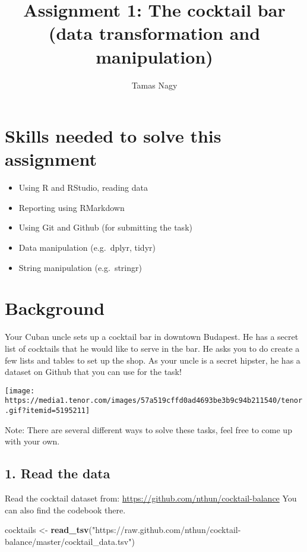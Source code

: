 \documentclass[
]{article}
\title{Assignment 1: The cocktail bar (data transformation and manipulation)}
\author{Tamas Nagy}
\date{}
\newenvironment{Shaded}{\begin{snugshade}}{\end{snugshade}}
\newcommand{\KeywordTok}[1]{\textcolor[rgb]{0.13,0.29,0.53}{\textbf{#1}}}
\newcommand{\NormalTok}[1]{#1}
\newcommand{\StringTok}[1]{\textcolor[rgb]{0.31,0.60,0.02}{#1}}
\providecommand{\tightlist}{%
  \setlength{\itemsep}{0pt}\setlength{\parskip}{0pt}}
\begin{document}
\maketitle

\hypertarget{skills-needed-to-solve-this-assignment}{%
\section{Skills needed to solve this
assignment}\label{skills-needed-to-solve-this-assignment}}

\begin{itemize}
\tightlist
\item
  Using R and RStudio, reading data
\item
  Reporting using RMarkdown
\item
  Using Git and Github (for submitting the task)
\item
  Data manipulation (e.g.~dplyr, tidyr)
\item
  String manipulation (e.g.~stringr)
\end{itemize}

\hypertarget{background}{%
\section{Background}\label{background}}

Your Cuban uncle sets up a cocktail bar in downtown Budapest. He has a
secret list of cocktails that he would like to serve in the bar. He asks
you to do create a few lists and tables to set up the shop. As your
uncle is a secret hipster, he has a dataset on Github that you can use
for the task!

\texttt{[image: https://media1.tenor.com/images/57a519cffd0ad4693be3b9c94b211540/tenor.gif?itemid=5195211]}

Note: There are several different ways to solve these tasks, feel free
to come up with your own.

\hypertarget{read-the-data}{%
\subsection{1. Read the data}\label{read-the-data}}

Read the cocktail dataset from:
\url{https://github.com/nthun/cocktail-balance} You can also find the
codebook there.

\begin{Shaded}
\begin{Highlighting}[]
\NormalTok{cocktails <-}\StringTok{ }\KeywordTok{read_tsv}\NormalTok{(}\StringTok{"https://raw.github.com/nthun/cocktail-balance/master/cocktail_data.tsv"}\NormalTok{)}
\end{Highlighting}
\end{Shaded}
\end{document}

